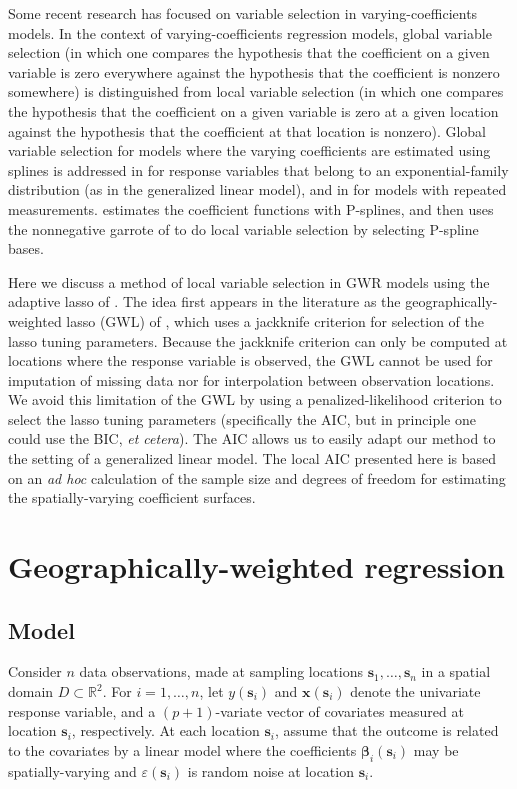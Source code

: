 \documentclass[authoryear, review, 11pt]{elsarticle}
\begin{document}
	Some recent research has focused on variable selection in varying-coefficients models. In the context of varying-coefficients regression models, global variable selection (in which one compares the hypothesis that the coefficient on a given variable is zero everywhere against the hypothesis that the coefficient is nonzero somewhere) is distinguished from local variable selection (in which one compares the hypothesis that the coefficient on a given variable is zero at a given location against the hypothesis that the coefficient at that location is nonzero). Global variable selection for models where the varying coefficients are estimated using splines is addressed in \cite{Fan:1999} for response variables that belong to an exponential-family distribution (as in the generalized linear model), and in \cite{Wang:2008a} for models with repeated measurements. \cite{Antoniadis:2012a} estimates the coefficient functions with P-splines, and then uses the nonnegative garrote of \cite{Breiman:1995} to do local variable selection by selecting P-spline bases.
	
	Here we discuss a method of local variable selection in GWR models using the adaptive lasso of \cite{Zou:2006}. The idea first appears in the literature as the geographically-weighted lasso (GWL) of \cite{Wheeler:2009}, which uses a jackknife criterion for selection of the lasso tuning parameters. Because the jackknife criterion can only be computed at locations where the response variable is observed, the GWL cannot be used for imputation of missing data nor for interpolation between observation locations. We avoid this limitation of the GWL by using a penalized-likelihood criterion to select the lasso tuning parameters (specifically the AIC, but in principle one could use the BIC, \emph{et cetera}). The AIC allows us to easily adapt our method to the setting of a generalized linear model. The local AIC presented here is based on an \emph{ad hoc} calculation of the sample size and degrees of freedom for estimating the spatially-varying coefficient surfaces.
	
\section{Geographically-weighted regression \label{section:GWR}}

	\subsection{Model}
	Consider $n$ data observations, made at sampling locations $\bm{s}_1, \dots, \bm{s}_n$ in a spatial domain $D \subset \mathbb{R}^2$. For $i = 1, \dots, n$, let $y(\bm{s}_i)$ and $\bm{x}(\bm{s}_i)$ denote the univariate response variable, and a $(p+1)$-variate vector of covariates measured at location $\bm{s}_i$, respectively. At each location $\bm{s}_i$, assume that the outcome is related to the covariates by a linear model where the coefficients $\bm{\beta}_i(\bm{s}_i)$ may be spatially-varying and $\varepsilon(\bm{s}_i)$ is random noise at location $\bm{s}_i$.
\end{document}
